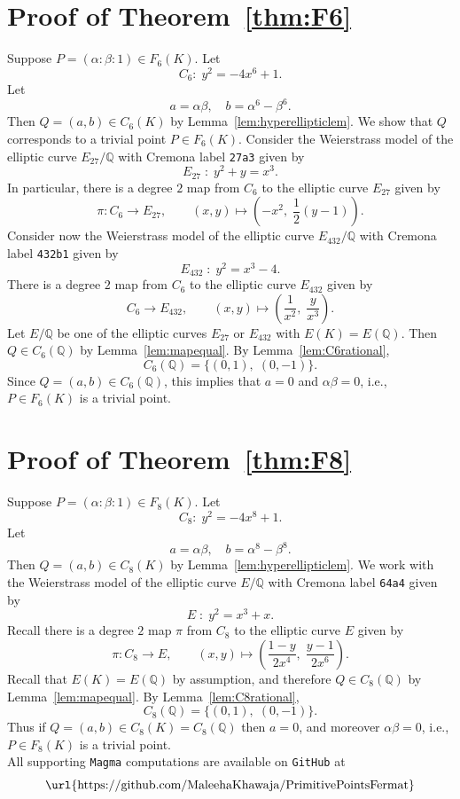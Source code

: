 \documentclass{amsart}
\theoremstyle{definition}
\newcommand{\Q}{\mathbb{Q}}
\begin{document}
\section{Proof of Theorem~\ref{thm:F6}}\label{sec:proofF6}

    Suppose $P=(\alpha:\beta:1)\in F_{6}(K)$. 
   Let
   \[
    C_{6}:\; y^2=-4x^6+1.
    \]
Let
\[
a=\alpha\beta, \quad b=\alpha^6-\beta^6.
\]
Then $Q=(a,b)\in C_{6}(K)$ by Lemma~\ref{lem:hyperellipticlem}. 
We show that $Q$ corresponds to a trivial point $P\in F_{6}(K)$.
Consider the Weierstrass model of the elliptic curve $E_{27}/\Q$ with Cremona label \texttt{27a3} given by 
\[
E_{27}\;:\; y^2 + y = x^3.
\]
In particular, there is a degree $2$ map from $C_{6}$ to the elliptic curve $E_{27}$ given by 
\[
\pi: C_{6}\rightarrow E_{27},\qquad (x,y)\mapsto \left(-x^2,\;\frac{1}{2}(y-1)\right).
\]
Consider now the Weierstrass model of the elliptic curve $E_{432}/\Q$ with Cremona label \texttt{432b1} given by 
\[
E_{432}\;:\; y^2 = x^3 - 4.
\]
There is a degree $2$ map from $C_{6}$ to the elliptic curve $E_{432}$ given by 
\[
C_{6}\rightarrow E_{432},\qquad (x,y)\mapsto \left(\dfrac{1}{x^2},\;\dfrac{y}{x^3}\right).
\]
Let $E/\Q$ be one of the elliptic curves $E_{27}$ or $E_{432}$ with $E(K)=E(\Q)$. Then $Q\in C_{6}(\Q)$ by Lemma~\ref{lem:mapequal}. By Lemma~\ref{lem:C6rational}, 
\[
C_{6}(\Q)=\{(0,1),\;(0,-1)\}.
\]
Since $Q=(a,b)\in C_{6}(\Q)$, this implies that $a=0$ and $\alpha\beta=0$, i.e., $P\in F_6(K)$ is a trivial point.

\section{Proof of Theorem~\ref{thm:F8}}\label{sec:proofF8}

    Suppose $P=(\alpha:\beta:1)\in F_{8}(K)$. 
   Let
   \[
    C_{8}:\; y^2=-4x^8+1.
    \]
Let
\[
a=\alpha\beta, \quad b=\alpha^8-\beta^8.
\]
Then $Q=(a,b)\in C_{8}(K)$ by Lemma~\ref{lem:hyperellipticlem}. 
We work with the Weierstrass model of the elliptic curve $E/\Q$ with Cremona label \texttt{64a4} given by 
\[
    E\;:\; y^2=x^3+x.
\]
Recall there is a degree $2$ map $\pi$ from $C_{8}$ to the elliptic curve $E$ given by 
\[
\pi: C_{8}\rightarrow E,\qquad (x,y)\mapsto \left(\dfrac{1-y}{2x^4},\;\dfrac{y-1}{2x^6}\right).
\]
Recall that $E(K)=E(\Q)$ by assumption, and therefore $Q\in C_{8}(\Q)$ by Lemma~\ref{lem:mapequal}. 
By Lemma~\ref{lem:C8rational},
\[
C_{8}(\Q)=\{(0,1),\; (0,-1)\}.
\]
Thus if $Q=(a,b)\in C_{8}(K)=C_{8}(\Q)$ then $a=0$, and moreover $\alpha\beta=0$, i.e., $P\in F_8(K)$ is a trivial point.\\

All supporting \texttt{Magma} computations 
are available on \texttt{GitHub} at 
\[\text{\url{https://github.com/MaleehaKhawaja/PrimitivePointsFermat}}
\]



\end{document}

